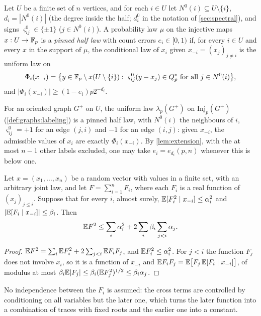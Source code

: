 \begin{definition}\label{def:pinned-law}
Let $U$ be a finite set of $n$ vertices, and for each $i\in U$ let
$N^0(i)\subseteq U\setminus\{i\}$, $d_i=|N^0(i)|$ (the degree inside the half; $d^0_i$ in the notation of \cref{sec:spectral}), and signs
$\varsigma^0_{ij}\in\{\pm1\}$ ($j\in N^0(i)$). A probability law $\mu$ on the
injective maps $x:U\to\mathbb F_p$ is a \emph{pinned half law} with count errors
$e_i\in[0,1)$ if, for every $i\in U$ and every $x$ in the support of $\mu$, the
conditional law of $x_i$ given $x_{-i}=(x_j)_{j\ne i}$ is the uniform law on
\[
  \Phi_i(x_{-i})=\big\{y\in\mathbb F_p\setminus x(U\setminus\{i\}):\
  \varsigma^0_{ij}(y-x_j)\in Q_{p}^{*}\ \text{for all}\ j\in N^0(i)\big\},
\]
and $|\Phi_i(x_{-i})|\ge(1-e_i)p2^{-d_i}$.
\end{definition}

For an oriented graph $G^+$ on $U$, the uniform law $\lambda_p(G^+)$ on
$\mathrm{Inj}_p(G^+)$ (\cref{def:graphs:labeling}) is a pinned half law, with
$N^0(i)$ the neighbours of $i$, $\varsigma^0_{ij}=+1$ for an edge $(j,i)$ and
$-1$ for an edge $(i,j)$: given $x_{-i}$, the admissible values of $x_i$ are
exactly $\Phi_i(x_{-i})$. By \cref{lem:extension}, with the at most $n-1$
other labels excluded, one may take $e_i=e_{d_i}(p,n)$ whenever this is below
one.

\begin{lemma}\label{lem:ordered-orthogonality}
Let $x=(x_1,\dots,x_n)$ be a random vector with values in a finite set, with an
arbitrary joint law, and let $F=\sum_{i=1}^nF_i$, where each $F_i$ is a real
function of $(x_j)_{j\le i}$. Suppose that for every $i$, almost surely,
$\mathbb E[F_i^2\mid x_{-i}]\le\alpha_i^2$ and $|\mathbb E[F_i\mid x_{-i}]|\le\beta_i$. Then
\[
  \mathbb E F^2\le\sum_i\alpha_i^2+2\sum_i\beta_i\sum_{j<i}\alpha_j .
\]
\end{lemma}

\begin{proof}
$\mathbb E F^2=\sum_i\mathbb E F_i^2+2\sum_{j<i}\mathbb E F_iF_j$, and $\mathbb E F_i^2\le\alpha_i^2$. For
$j<i$ the function $F_j$ does not involve $x_i$, so it is a function of $x_{-i}$
and $\mathbb E F_iF_j=\mathbb E\big[F_j\,\mathbb E[F_i\mid x_{-i}]\big]$, of modulus at most
$\beta_i\mathbb E|F_j|\le\beta_i(\mathbb E F_j^2)^{1/2}\le\beta_i\alpha_j$.
\end{proof}

No independence between the $F_i$ is assumed: the cross terms are controlled
by conditioning on all variables but the later one, which turns the later
function into a combination of traces with fixed roots and the earlier one
into a constant.

